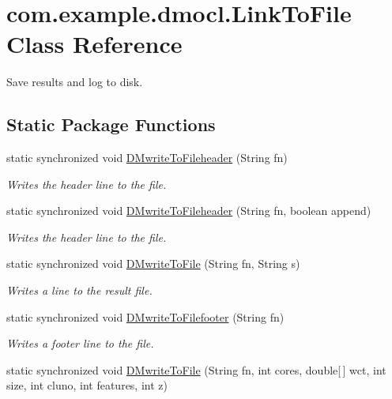 \hypertarget{classcom_1_1example_1_1dmocl_1_1LinkToFile}{}\section{com.\+example.\+dmocl.\+Link\+To\+File Class Reference}
\label{classcom_1_1example_1_1dmocl_1_1LinkToFile}


Save results and log to disk.  


\subsection*{Static Package Functions}
\begin{DoxyCompactItemize}
\item 
static synchronized void \mbox{\hyperlink{classcom_1_1example_1_1dmocl_1_1LinkToFile_a2ffa199a1de9e47644702409e25dd704}{D\+Mwrite\+To\+Fileheader}} (String fn)
\begin{DoxyCompactList}\small\item\em Writes the header line to the file. \end{DoxyCompactList}\item 
static synchronized void \mbox{\hyperlink{classcom_1_1example_1_1dmocl_1_1LinkToFile_a8cbd37ee89ecd01dcd55022c6ce74795}{D\+Mwrite\+To\+Fileheader}} (String fn, boolean append)
\begin{DoxyCompactList}\small\item\em Writes the header line to the file. \end{DoxyCompactList}\item 
static synchronized void \mbox{\hyperlink{classcom_1_1example_1_1dmocl_1_1LinkToFile_adb20b84275dde1b5b5808bfa80ec4969}{D\+Mwrite\+To\+File}} (String fn, String s)
\begin{DoxyCompactList}\small\item\em Writes a line to the result file. \end{DoxyCompactList}\item 
static synchronized void \mbox{\hyperlink{classcom_1_1example_1_1dmocl_1_1LinkToFile_a718e692d3583958f315ebe75c6569e74}{D\+Mwrite\+To\+Filefooter}} (String fn)
\begin{DoxyCompactList}\small\item\em Writes a footer line to the file. \end{DoxyCompactList}\item 
static synchronized void \mbox{\hyperlink{classcom_1_1example_1_1dmocl_1_1LinkToFile_a14393cd229c571ec80b236d1bd406e43}{D\+Mwrite\+To\+File}} (String fn, int cores, double\mbox{[}$\,$\mbox{]} wct, int size, int cluno, int features, int z)

\end{DoxyCompactItemize}
